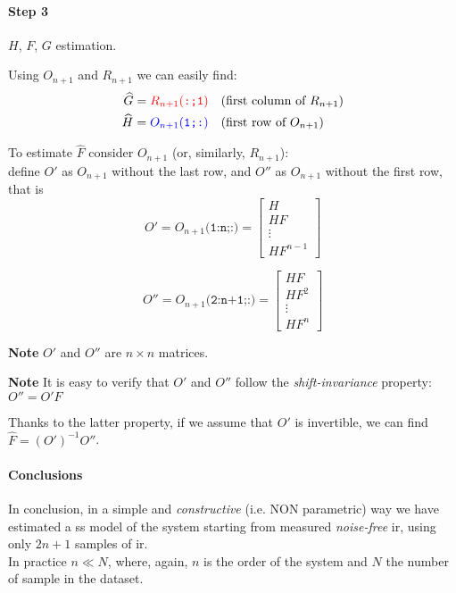 \paragraph{Step 3} \label{4SID-NF:step3} $H$, $F$, $G$ estimation.

Using $O_{n+1}$ and $R_{n+1}$ we can easily find:
\begin{align*}
    \hat{G} =  \color{red} R_{n+1}(\texttt{:;1}) & \quad\text{(first column of $R_{n+1}$)} \\
    \hat{H} =  \color{blue} O_{n+1}(\texttt{1;:}) & \quad\text{(first row of $O_{n+1}$)} \\
\end{align*}

To estimate $\hat{F}$ consider $O_{n+1}$ (or, similarly, $R_{n+1}$):\\
define $O'$ as $O_{n+1}$ without the last row, and $O''$ as $O_{n+1}$ without the first row, that is
\[O' = O_{n+1}\texttt{(1:n;:)} = \begin{bmatrix}
        H \\
        HF \\
        \vdots \\
        HF^{n-1}
    \end{bmatrix}\]

\[ O'' = O_{n+1}\texttt{(2:n+1;:)} = \begin{bmatrix}
        HF \\
        HF^2 \\
        \vdots \\
        HF^{n}
    \end{bmatrix}\]

\textbf{Note} $O'$ and $O''$ are $n\times n$ matrices.

\textbf{Note} It is easy to verify that $O'$ and $O''$ follow the \emph{shift-invariance} property: $O''= O' F$


Thanks to the latter property, if we assume that $O'$ is invertible, we can find $\hat{F} = (O')^{-1}O''$.

\paragraph{Conclusions}
In conclusion, in a simple and \emph{constructive} (i.e. NON parametric) way we have estimated a \acrlong{ss} model of the system starting from measured \emph{noise-free} \gls{ir}, using only $2n+1$ samples of \gls{ir}. \\
In practice $n \ll N$, where, again, $n$ is the order of the system and $N$ the number of sample in the dataset.

